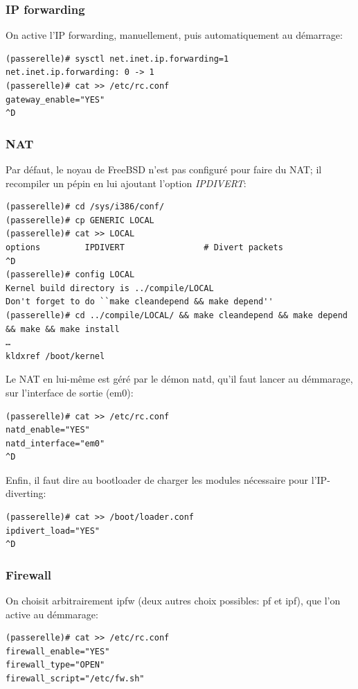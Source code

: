 \documentclass[a4paper]{article}
\begin{document}
\subsubsection{IP forwarding}
On active l'IP forwarding, manuellement, puis automatiquement
au démarrage:

\begin{verbatim}
(passerelle)# sysctl net.inet.ip.forwarding=1
net.inet.ip.forwarding: 0 -> 1
(passerelle)# cat >> /etc/rc.conf
gateway_enable="YES"
^D
\end{verbatim}

\subsubsection{NAT}
Par défaut, le noyau de FreeBSD n'est pas configuré pour faire
du NAT; il recompiler un pépin en lui ajoutant l'option \textit{IPDIVERT}:
\begin{verbatim}
(passerelle)# cd /sys/i386/conf/
(passerelle)# cp GENERIC LOCAL
(passerelle)# cat >> LOCAL
options         IPDIVERT                # Divert packets
^D
(passerelle)# config LOCAL
Kernel build directory is ../compile/LOCAL
Don't forget to do ``make cleandepend && make depend''
(passerelle)# cd ../compile/LOCAL/ && make cleandepend && make depend && make && make install
…
kldxref /boot/kernel
\end{verbatim}

Le NAT en lui-même est géré par le démon natd, qu'il faut lancer
au démmarage, sur l'interface de sortie (em$0$):
\begin{verbatim}
(passerelle)# cat >> /etc/rc.conf
natd_enable="YES"
natd_interface="em0"
^D
\end{verbatim}

Enfin, il faut dire au bootloader de charger les modules nécessaire
pour l'IP-diverting:
\begin{verbatim}
(passerelle)# cat >> /boot/loader.conf
ipdivert_load="YES"
^D
\end{verbatim}

\subsubsection{Firewall}
On choisit arbitrairement ipfw (deux autres choix possibles: pf et ipf),
que l'on active au démmarage:
\begin{verbatim}
(passerelle)# cat >> /etc/rc.conf
firewall_enable="YES"
firewall_type="OPEN"
firewall_script="/etc/fw.sh"
\end{verbatim}
\end{document}

